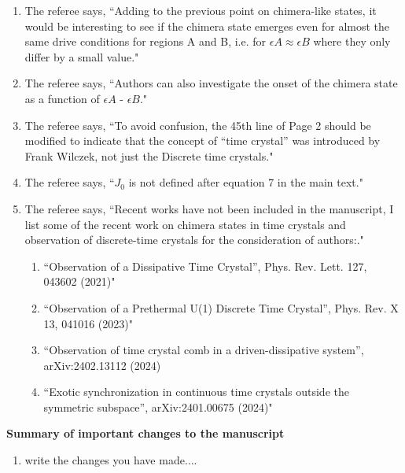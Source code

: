 \documentclass[aps,prb,reprint,showpacs,floatfix,superscriptaddress, onecolumn, nofootinbib, 10pt]{revtex4-2}
\newcommand{\comment}[1]{{\color{blue}#1}} %
\begin{document}
\begin{enumerate}
\begin{enumerate}
		\item The referee says, \comment{``Adding to the previous point on chimera-like states, it would be interesting to see if
			the chimera state emerges even for almost the same drive conditions for regions A
			and B, i.e. for $\epsilon A \approx \epsilon B$ where they only differ by a small value."}\\
		\item The referee says, \comment{``Authors can also investigate the onset of the chimera state as a function of $\epsilon A$ - $\epsilon B$."}\\
		\item The referee says, \comment{``To avoid confusion, the 45th line of Page 2 should be modified to indicate that the concept of “time crystal” was introduced by Frank Wilczek, not just the Discrete time crystals."}\\
		\item The referee says, \comment{``$J_0$ is not defined after equation 7 in the main text."}\\
		\item The referee says, \comment{``Recent works have not been included in the manuscript, I list some of the recent work on chimera states in time crystals and observation of discrete-time crystals for the consideration of authors:."}
		\begin{enumerate}
			\item \comment{``Observation of a Dissipative Time Crystal”, Phys. Rev. Lett. 127, 043602 (2021)"}
			\item \comment{``Observation of a Prethermal U(1) Discrete Time Crystal”, Phys. Rev. X 13, 041016 (2023)"}
			\item \comment{``Observation of time crystal comb in a driven-dissipative system”, arXiv:2402.13112 (2024)}
			\item \comment{``Exotic synchronization in continuous time crystals outside the symmetric subspace”, arXiv:2401.00675 (2024)"}
		\end{enumerate}
	\end{enumerate}
\end{enumerate}
		
		

	
	
\noindent \textbf{Summary of important changes to the  manuscript}
\begin{enumerate}
	\item write the changes you have made$\dots$.
\end{enumerate}
\end{document}
